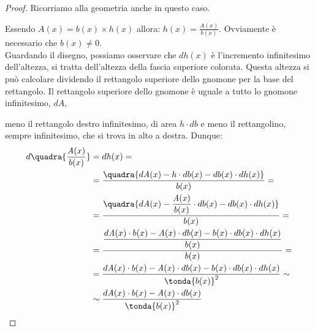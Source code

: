 \begin{proof}
Ricorriamo alla geometria anche in questo caso.


 \begin{minipage}[]{.38 \textwidth}
Essendo $\mathit{A}(x)=b(x) \times h(x)$ allora: 
$h(x)=\frac{A(x)}{b(x)}$. 
Ovviamente è necessario che $b(x)\neq 0$.\\
Guardando il disegno, possiamo osservare che $dh(x)$ è l'incremento 
infinitesimo dell'altezza, si tratta dell'altezza della fascia superiore 
colorata.
Questa altezza si può calcolare dividendo il rettangolo 
superiore dello gnomone per la base del rettangolo.
Il rettangolo superiore dello gnomone è uguale a tutto lo gnomone 
infinitesimo, $d\mathit{A}$,
 \end{minipage} 
 \hfill
 \begin{minipage}[]{.58 \textwidth}
 \begin{center}
 \begin{inaccessibleblock}
  \differenzialerapporto
 \end{inaccessibleblock}
 \end{center}
 \end{minipage}
meno il rettangolo destro infinitesimo, di 
area $h\cdot db$ e meno il rettangolino, sempre infinitesimo, che si trova 
in alto a destra.
Dunque:
\begin{align}
 d\quadra{\frac{\mathit{A}(x)}{b(x)}}&=dh(x)=\\
 &=\frac{\quadra{d\mathit{A}(x) - h \cdot db(x) - db(x) \cdot dh(x)}}
        {b(x)}=\\
 &=\frac{\quadra{d\mathit{A}(x) - \dfrac{\mathit{A(x)}}{b(x)} \cdot db(x) - 
          db(x) \cdot dh(x)}}{b(x)}=\\
 &=\frac{\dfrac{d\mathit{A}(x) \cdot b(x) - \mathit{A(x)} \cdot db(x) -
               b(x) \cdot db(x) \cdot dh(x)}
              {b(x)}}
        {b(x)}=\\
 &=\frac{d\mathit{A}(x) \cdot b(x) - \mathit{A(x)} \cdot db(x) -
              b(x) \cdot db(x) \cdot dh(x)}
        {\tonda{b(x)}^2} \sim \\
 & \sim \frac{d\mathit{A}(x) \cdot b(x) - \mathit{A(x)} \cdot db(x)}
             {\tonda{b(x)}^2}
\end{align}
\end{proof}

